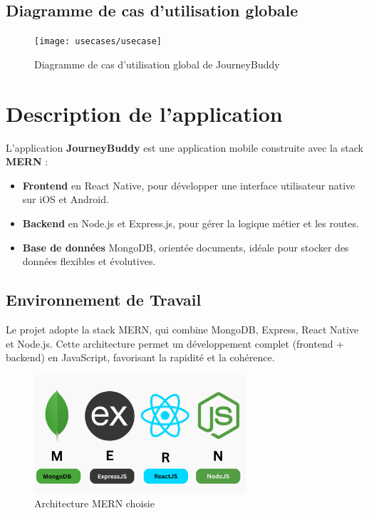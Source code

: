 \subsection{Diagramme de cas d'utilisation globale}

\begin{figure}[H]
    \centering
    \texttt{[image: usecases/usecase]}
    \caption{Diagramme de cas d'utilisation global de JourneyBuddy}
\end{figure}

\section{Description de l'application}

L’application \textbf{JourneyBuddy} est une application mobile construite avec la stack \textbf{MERN} :

\begin{itemize}
    \item \textbf{Frontend} en React Native, pour développer une interface utilisateur native sur iOS et Android.
    \item \textbf{Backend} en Node.js et Express.js, pour gérer la logique métier et les routes.
    \item \textbf{Base de données} MongoDB, orientée documents, idéale pour stocker des données flexibles et évolutives.
\end{itemize}

\subsection{Environnement de Travail}

Le projet adopte la stack MERN, qui combine MongoDB, Express, React Native et Node.js. Cette architecture permet un développement complet (frontend + backend) en JavaScript, favorisant la rapidité et la cohérence.

\begin{figure}[H]
    \centering
    \includegraphics[width=0.7\textwidth]{logos/mern.png}
    \caption{Architecture MERN choisie}
\end{figure}

